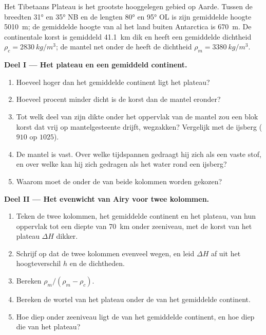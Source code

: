 \begin{problem}
\label{pb:g11:lithosphere-asthenosphere:1}
Het Tibetaans Plateau is het grootste hooggelegen gebied op Aarde. Tussen de
breedten \ang{31} en \ang{35} NB en de lengten \ang{80} en \ang{95} OL is zijn
gemiddelde hoogte \qty{5010}{m}; de gemiddelde hoogte van al het land buiten
Antarctica is \qty{670}{m}. De continentale korst is gemiddeld \qty{41.1}{km}
dik en heeft een gemiddelde dichtheid $\rho_c = \qty{2830}{kg/m^3}$; de mantel
net onder de  heeft de dichtheid $\rho_m = \qty{3380}{kg/m^3}$.

\medskip
\noindent\textbf{Deel I --- Het plateau en een gemiddeld continent.}
\begin{enumerate}
  \item Hoeveel hoger dan het gemiddelde continent ligt het plateau?
  \item Hoeveel procent minder dicht is de korst dan de mantel eronder?
  \item Tot welk deel van zijn dikte onder het oppervlak van de mantel zou een
        blok korst dat vrij op mantelgesteente drijft, wegzakken? Vergelijk met
        de ijsberg ($910$ op $1025$).
  \item De mantel is vast. Over welke tijdspannen gedraagt hij zich als een vaste
        stof, en over welke kan hij zich gedragen als het water rond een
        ijsberg?
  \item Waarom moet de  onder de  van beide kolommen worden
        gekozen?
\end{enumerate}

\medskip
\noindent\textbf{Deel II --- Het evenwicht van Airy voor twee kolommen.}
\begin{enumerate}[resume]
  \item Teken de twee kolommen, het gemiddelde continent en het plateau, van hun
        oppervlak tot een diepte van \qty{70}{km} onder zeeniveau, met de korst
        van het plateau $\Delta H$ dikker.
  \item Schrijf op dat de twee kolommen evenveel wegen, en leid $\Delta H$ af
        uit het hoogteverschil $h$ en de dichtheden.
  \item Bereken $\rho_m/(\rho_m - \rho_c)$.
  \item Bereken de wortel van het plateau onder de  van het gemiddelde
        continent.
  \item Hoe diep onder zeeniveau ligt de  van het gemiddelde continent, en
        hoe diep die van het plateau?
\end{enumerate}


\end{problem}
